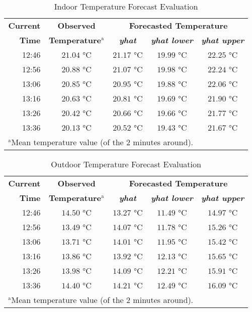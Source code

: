 \documentclass[conference]{IEEEtran}
\begin{document}
\begin{table}[htbp]
\caption{Indoor Temperature Forecast Evaluation}
\begin{center}
\begin{tabular}{|r|c|c|c|c|}
\hline
\textbf{Current} & \textbf{Observed} & \multicolumn{3}{|c|}{\textbf{Forecasted Temperature}} \\
\cline{3-5}
\textbf{Time} & \textbf{Temperature}$^{\mathrm{a}}$ & \textbf{\textit{yhat}} & \textbf{\textit{yhat lower}} & \textbf{\textit{yhat upper}} \\
\hline
12:46 & $21.04$ °C & $21.17$ °C & $19.99$ °C & $22.25$ °C \\
\hline
12:56 & $20.88$ °C & $21.07$ °C & $19.98$ °C & $22.24$ °C \\
\hline
13:06 & $20.85$ °C & $20.95$ °C & $19.88$ °C & $22.06$ °C \\
\hline
13:16 & $20.63$ °C & $20.81$ °C & $19.69$ °C & $21.90$ °C \\
\hline
13:26 & $20.42$ °C & $20.66$ °C & $19.66$ °C & $21.77$ °C \\
\hline
13:36 & $20.13$ °C & $20.52$ °C & $19.43$ °C & $21.67$ °C \\
\hline
\multicolumn{4}{l}{$^{\mathrm{a}}$Mean temperature value (of the 2 minutes around).}
\end{tabular}
\label{tab_forecast_indoor}
\end{center}
\end{table}

\begin{table}[htbp]
\caption{Outdoor Temperature Forecast Evaluation}
\begin{center}
\begin{tabular}{|r|c|c|c|c|}
\hline
\textbf{Current} & \textbf{Observed} & \multicolumn{3}{|c|}{\textbf{Forecasted Temperature}} \\
\cline{3-5}
\textbf{Time} & \textbf{Temperature}$^{\mathrm{a}}$ & \textbf{\textit{yhat}} & \textbf{\textit{yhat lower}} & \textbf{\textit{yhat upper}} \\
\hline
12:46 & $14.50$ °C & $13.27$ °C & $11.49$ °C & $14.97$ °C \\
\hline
12:56 & $13.49$ °C & $14.07$ °C & $11.78$ °C & $15.26$ °C \\
\hline
13:06 & $13.71$ °C & $14.01$ °C & $11.95$ °C & $15.42$ °C \\
\hline
13:16 & $13.86$ °C & $13.92$ °C & $12.13$ °C & $15.65$ °C \\
\hline
13:26 & $13.98$ °C & $14.09$ °C & $12.21$ °C & $15.91$ °C \\
\hline
13:36 & $14.40$ °C & $14.21$ °C & $12.49$ °C & $16.09$ °C \\
\hline
\multicolumn{4}{l}{$^{\mathrm{a}}$Mean temperature value (of the 2 minutes around).}
\end{tabular}
\label{tab_forecast_outdoor}
\end{center}
\end{table}
\end{document}
